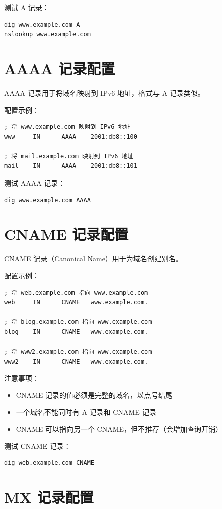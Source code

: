 \documentclass[12pt,UTF8]{ctexbook}
\begin{document}
测试 A 记录：
\begin{verbatim}
dig www.example.com A
nslookup www.example.com
\end{verbatim}

\section{AAAA 记录配置}
\label{sec:aaaa_record}

AAAA 记录用于将域名映射到 IPv6 地址，格式与 A 记录类似。

配置示例：
\begin{verbatim}
; 将 www.example.com 映射到 IPv6 地址
www     IN      AAAA    2001:db8::100

; 将 mail.example.com 映射到 IPv6 地址
mail    IN      AAAA    2001:db8::101
\end{verbatim}

测试 AAAA 记录：
\begin{verbatim}
dig www.example.com AAAA
\end{verbatim}

\section{CNAME 记录配置}
\label{sec:cname_record}

CNAME 记录（Canonical Name）用于为域名创建别名。

配置示例：
\begin{verbatim}
; 将 web.example.com 指向 www.example.com
web     IN      CNAME   www.example.com.

; 将 blog.example.com 指向 www.example.com
blog    IN      CNAME   www.example.com.

; 将 www2.example.com 指向 www.example.com
www2    IN      CNAME   www.example.com.
\end{verbatim}

注意事项：
\begin{itemize}
    \item CNAME 记录的值必须是完整的域名，以点号结尾
    \item 一个域名不能同时有 A 记录和 CNAME 记录
    \item CNAME 可以指向另一个 CNAME，但不推荐（会增加查询开销）
\end{itemize}

测试 CNAME 记录：
\begin{verbatim}
dig web.example.com CNAME
\end{verbatim}

\section{MX 记录配置}
\label{sec:mx_record}
\end{document}
